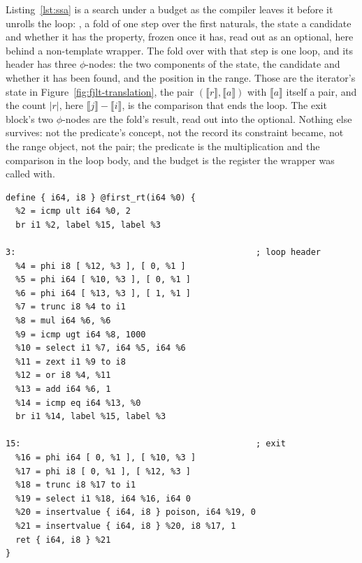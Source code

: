 Listing~\ref{lst:ssa} is a search under a budget as the compiler leaves it before it unrolls the loop: , a fold of one step over the first  naturals, the state a candidate and whether it has the property, frozen once it has, read out as an optional, here behind a non-template wrapper.
The fold over  with that step is one loop, and its header has three $\phi$-nodes: the two components of the state, the candidate and whether it has been found, and the position in the range.
Those are the iterator's state in Figure~\ref{fig:fjlt-translation}, the pair $(\llbracket r \rrbracket, \llbracket a \rrbracket)$ with $\llbracket a \rrbracket$ itself a pair, and the count $|r|$, here $\llbracket j \rrbracket - \llbracket i \rrbracket$, is the comparison that ends the loop.
The exit block's two $\phi$-nodes are the fold's result, read out into the optional.
Nothing else survives: not the predicate's concept, not the record its constraint became, not the range object, not the pair; the predicate is the multiplication and the comparison in the loop body, and the budget is the register the wrapper was called with.

\begin{listing}[htbp]
\begin{verbatim}
define { i64, i8 } @first_rt(i64 %0) {
  %2 = icmp ult i64 %0, 2
  br i1 %2, label %15, label %3

3:                                                ; loop header
  %4 = phi i8 [ %12, %3 ], [ 0, %1 ]
  %5 = phi i64 [ %10, %3 ], [ 0, %1 ]
  %6 = phi i64 [ %13, %3 ], [ 1, %1 ]
  %7 = trunc i8 %4 to i1
  %8 = mul i64 %6, %6
  %9 = icmp ugt i64 %8, 1000
  %10 = select i1 %7, i64 %5, i64 %6
  %11 = zext i1 %9 to i8
  %12 = or i8 %4, %11
  %13 = add i64 %6, 1
  %14 = icmp eq i64 %13, %0
  br i1 %14, label %15, label %3

15:                                               ; exit
  %16 = phi i64 [ 0, %1 ], [ %10, %3 ]
  %17 = phi i8 [ 0, %1 ], [ %12, %3 ]
  %18 = trunc i8 %17 to i1
  %19 = select i1 %18, i64 %16, i64 0
  %20 = insertvalue { i64, i8 } poison, i64 %19, 0
  %21 = insertvalue { i64, i8 } %20, i8 %17, 1
  ret { i64, i8 } %21
}
\end{verbatim}
\caption{ in LLVM IR, Clang 23 at \texttt{-std=c++23 -O2} with unrolling and vectorisation off, attributes and metadata stripped; Appendix~\ref{app:fjlt:ssa} reads it.}
\label{lst:ssa}
\end{listing}

